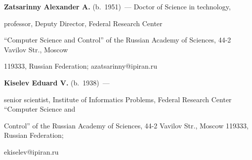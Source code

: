       \textbf{Zatsarinny Alexander A.} (b.\ 1951)~--- Doctor of Science in technology, 

professor, Deputy Director, Federal Research Center 

``Computer Science and Control'' of the Russian Academy of Sciences, 44-2 Vavilov Str., Moscow 

119333, Russian Federation; azatsarinny@ipiran.ru

      

      \vspace*{3pt}

      

\noindent

\textbf{Kiselev Eduard V.} (b.\ 1938)~---

senior scientist, Institute of Informatics Problems, Federal Research Center ``Computer Science and 

Control'' of the Russian Academy of Sciences, 44-2 Vavilov Str., Moscow 119333, Russian Federation;\linebreak

 ekiselev@ipiran.ru

      

 \label{end\stat}





\renewcommand{\bibname}{\protect\rm Литература} 

